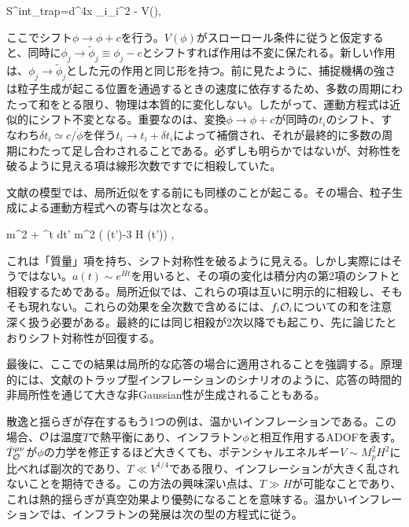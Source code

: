 \beq
S^{\rm int}_{\rm trap}=\int d^4x \sum_i\chi_i^2 - V(\phi),\eeq

ここでシフト$\phi\to\phi+c$を行う。$V(\phi)$がスローロール条件に従うと仮定すると、同時に$\phi_j\to\tilde\phi_j\equiv\phi_j-c$とシフトすれば作用は不変に保たれる。新しい作用は、$\phi_j\to\tilde\phi_j$とした元の作用と同じ形を持つ。前に見たように、捕捉機構の強さは粒子生成が起こる位置を通過するときの速度に依存するため、多数の周期にわたって和をとる限り、物理は本質的に変化しない。したがって、運動方程式は近似的にシフト不変となる。重要なのは、変換$\phi\to\phi+c$が同時の$t_i$のシフト、すなわち$\delta t_i\simeq c/\dot\phi$を伴う$t_i\to t_i+\delta t_i$によって補償され、それが最終的に多数の周期にわたって足し合わされることである\cite{trapped}。必ずしも明らかではないが、対称性を破るように見える項は線形次数ですでに相殺していた。

文献\cite{trapped}の模型では、局所近似をする前にも同様のことが起こる。その場合、粒子生成による運動方程式への寄与は次となる\cite{trapped}。

\beq
\hat m^2 \delta\phi + \int^t dt' \hat m^2 \left( \dot{\delta\phi}(t')-3 H \delta\phi(t')\right) ,
\eeq

これは「質量」項を持ち、シフト対称性を破るように見える。しかし実際にはそうではない。$a(t)\sim e^{Ht}$を用いると、その項の変化は積分内の第2項のシフトと相殺するためである。局所近似では、これらの項は互いに明示的に相殺し、そもそも現れない。これらの効果を全次数で含めるには、$f_i{\cal O}_i$についての和を注意深く扱う必要がある。最終的には同じ相殺が2次以降でも起こり、先に論じたとおりシフト対称性が回復する。

最後に、ここでの結果は局所的な応答の場合に適用されることを強調する。原理的には、文献\cite{trapped}のトラップ型インフレーションのシナリオのように、応答の時間的非局所性を通じて大きな非Gaussian性が生成されることもある。

\label{secwarm}

散逸と揺らぎが存在するもう1つの例は、温かいインフレーションである\cite{berera1,berera2,warm}。この場合、${\cal O}$は温度$T$で熱平衡にあり、インフラトン$\phi$と相互作用するADOFを表す。$\bar T_{\cal O}^{\mu\nu}$が$\phi$の力学を修正するほど大きくても、ポテンシャルエネルギー$V\sim M_p^2H^2$に比べれば副次的であり、$T\ll V^{1/4}$である限り、インフレーションが大きく乱されないことを期待できる。この方法の興味深い点は、$T\gg H$が可能なことであり、これは熱的揺らぎが真空効果より優勢になることを意味する。温かいインフレーションでは、インフラトンの発展は次の型の方程式に従う\cite{warm}。

